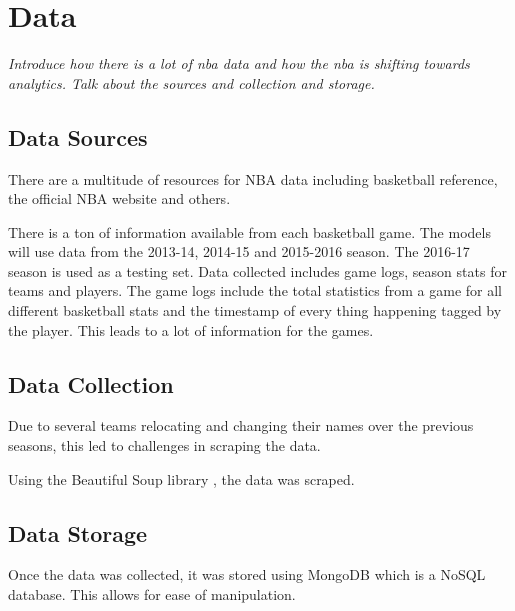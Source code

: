 \chapter{Data}

\textit{Introduce how there is a lot of nba data and how the nba is shifting towards analytics.  Talk about the sources and collection and storage.}

\section{Data Sources}
There are a multitude of resources for NBA data including basketball reference, the official NBA website and others.

There is a ton of information available from each basketball game.  The models will use data from the 2013-14, 2014-15 and 2015-2016 season.  The 2016-17 season is used as a testing set.  Data collected includes game logs, season stats for teams and players.  The game logs include the total statistics from a game for all different basketball stats and the timestamp of every thing happening tagged by the player.  This leads to a lot of information for the games.

\section{Data Collection}



Due to several teams relocating and changing their names over the previous seasons, this led to challenges in scraping the data.

Using the Beautiful Soup library \cite{beautifulsoup}, the data was scraped.

\section{Data Storage}
Once the data was collected, it was stored using MongoDB which is a NoSQL database.  This allows for ease of manipulation.

